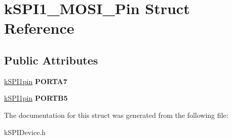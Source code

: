 \hypertarget{structkSPI1__MOSI__Pin}{}\section{k\+S\+P\+I1\+\_\+\+M\+O\+S\+I\+\_\+\+Pin Struct Reference}
\label{structkSPI1__MOSI__Pin}
\subsection*{Public Attributes}
\begin{DoxyCompactItemize}
\item 
\hyperlink{structkSPI1pin}{k\+S\+P\+I1pin} {\bfseries P\+O\+R\+T\+A7}\hypertarget{structkSPI1__MOSI__Pin_a54502731f7d03db868899508b35797be}{}\label{structkSPI1__MOSI__Pin_a54502731f7d03db868899508b35797be}

\item 
\hyperlink{structkSPI1pin}{k\+S\+P\+I1pin} {\bfseries P\+O\+R\+T\+B5}\hypertarget{structkSPI1__MOSI__Pin_a4c4028cd0ad97461fd4cd356bd0011ba}{}\label{structkSPI1__MOSI__Pin_a4c4028cd0ad97461fd4cd356bd0011ba}

\end{DoxyCompactItemize}


The documentation for this struct was generated from the following file\+:\begin{DoxyCompactItemize}
\item 
k\+S\+P\+I\+Device.\+h\end{DoxyCompactItemize}
